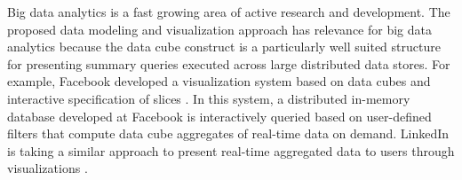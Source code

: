 Big data analytics is a fast growing area of active research and development. The proposed data modeling and visualization approach has relevance for big data analytics because the data cube construct is a particularly well suited structure for presenting summary queries executed across large distributed data stores. For example, Facebook developed a visualization system based on data cubes and interactive specification of slices \cite{facebookBigData}. In this system, a distributed in-memory database developed at Facebook is interactively queried based on user-defined filters that compute data cube aggregates of real-time data on demand. LinkedIn is taking a similar approach to present real-time aggregated data to users through visualizations \cite{linkedInBigData}.





